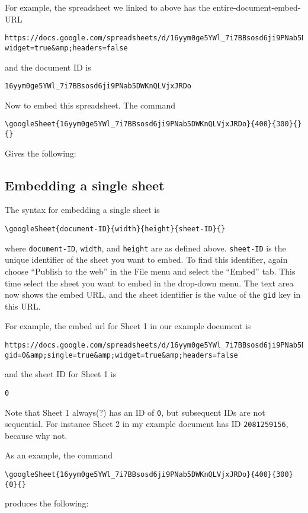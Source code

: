 \documentclass{ximera}
\begin{document}
For example, the spreadsheet we linked to above has the entire-document-embed-URL
\begin{verbatim}
https://docs.google.com/spreadsheets/d/16yym0ge5YWl_7i7BBsosd6ji9PNab5DWKnQLVjxJRDo/pubhtml?widget=true&amp;headers=false
\end{verbatim}
and the document ID is
\begin{verbatim}
16yym0ge5YWl_7i7BBsosd6ji9PNab5DWKnQLVjxJRDo
\end{verbatim}
 
Now to embed this spreadsheet. The command
\begin{verbatim}
\googleSheet{16yym0ge5YWl_7i7BBsosd6ji9PNab5DWKnQLVjxJRDo}{400}{300}{}{}
\end{verbatim}
Gives the following:
 
 
 
\subsection{Embedding a single sheet}
 
The syntax for embedding a single sheet is
\begin{verbatim}
\googleSheet{document-ID}{width}{height}{sheet-ID}{}
\end{verbatim}
where \texttt{document-ID}, \texttt{width}, and \texttt{height} are as defined above. \texttt{sheet-ID} is the unique identifier of the sheet you want to embed. To find this identifier, again choose ``Publish to the web'' in the File menu and select the ``Embed'' tab. This time select the sheet you want to embed in the drop-down menu. The text area now shows the embed URL, and the sheet identifier is the value of the \texttt{gid} key in this URL.
 
For example, the embed url for Sheet 1 in our example document is
\begin{verbatim}
https://docs.google.com/spreadsheets/d/16yym0ge5YWl_7i7BBsosd6ji9PNab5DWKnQLVjxJRDo/pubhtml?gid=0&amp;single=true&amp;widget=true&amp;headers=false
\end{verbatim}
and the sheet ID for Sheet 1 is
\begin{verbatim}
0
\end{verbatim}
Note that Sheet 1 always(?) has an ID of \texttt{0}, but subsequent IDs are not sequential. For instance Sheet 2 in my example document has ID \texttt{2081259156}, because why not.
 
As an example, the command
\begin{verbatim}
\googleSheet{16yym0ge5YWl_7i7BBsosd6ji9PNab5DWKnQLVjxJRDo}{400}{300}{0}{}
\end{verbatim}
produces the following:
 
\end{document}
